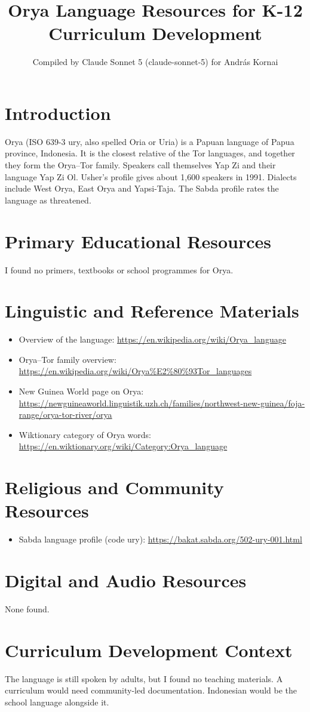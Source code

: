 \documentclass[12pt]{article}
\title{Orya Language Resources for K-12 Curriculum Development}
\author{Compiled by Claude Sonnet 5 (claude-sonnet-5) for Andr\'as Kornai}
\date{}
\begin{document}
\maketitle

\section{Introduction}
Orya (ISO 639-3 ury, also spelled Oria or Uria) is a Papuan language of Papua province, Indonesia. It is the closest relative of the Tor languages, and together they form the Orya--Tor family. Speakers call themselves Yap Zi and their language Yap Zi Ol. Usher's profile gives about 1,600 speakers in 1991. Dialects include West Orya, East Orya and Yapsi-Taja. The Sabda profile rates the language as threatened.

\section{Primary Educational Resources}
I found no primers, textbooks or school programmes for Orya.

\section{Linguistic and Reference Materials}
\begin{itemize}
\item Overview of the language: \url{https://en.wikipedia.org/wiki/Orya_language}
\item Orya--Tor family overview: \url{https://en.wikipedia.org/wiki/Orya%E2%80%93Tor_languages}
\item New Guinea World page on Orya: \url{https://newguineaworld.linguistik.uzh.ch/families/northwest-new-guinea/foja-range/orya-tor-river/orya}
\item Wiktionary category of Orya words: \url{https://en.wiktionary.org/wiki/Category:Orya_language}
\end{itemize}

\section{Religious and Community Resources}
\begin{itemize}
\item Sabda language profile (code ury): \url{https://bakat.sabda.org/502-ury-001.html}
\end{itemize}

\section{Digital and Audio Resources}
None found.

\section{Curriculum Development Context}
The language is still spoken by adults, but I found no teaching materials. A curriculum would need community-led documentation. Indonesian would be the school language alongside it.
\end{document}
